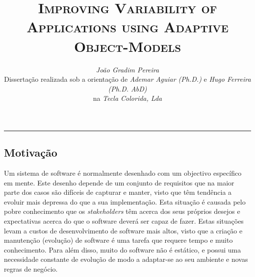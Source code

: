\documentclass[9pt,a4paper]{extarticle}
\begin{document}
\title{\vspace*{-8mm}\textbf{\textsc{Improving Variability of Applications using Adaptive Object-Models}}}
\author{\emph{João Gradim Pereira}\\[2mm]
\small{Dissertação realizada sob a orientação de \emph{Ademar Aguiar (Ph.D.)} e \emph{Hugo Ferreira (Ph.D. AbD)}}\\
\small{na \emph{Tecla Colorida, Lda}}}
\date{}
\maketitle
\thispagestyle{empty}

\vspace*{-4mm}\noindent\rule{\textwidth}{0.4pt}\vspace*{4mm}

\begin{multicols}{2}

\section{Motivação}\label{sec:motivation}


Um sistema de software é normalmente desenhado com um objectivo específico em mente. Este desenho depende de um conjunto de requisitos que na maior parte dos casos são difíceis de capturar e manter, visto que têm tendência a evoluir mais depressa do que a sua implementação. Esta situação é causada pelo pobre conhecimento que os \emph{stakeholders} têm acerca dos seus próprios desejos e expectativas acerca do que o software deverá ser capaz de fazer. Estas situações levam a custos de desenvolvimento de software mais altos, visto que a criação e manutenção (evolução) de software é uma tarefa que requere tempo e muito conhecimento. Para além disso, muito do software não é estático, e possui uma necessidade constante de evolução de modo a adaptar-se ao seu ambiente e novas regras de negócio.


\end{multicols}
\end{document}
